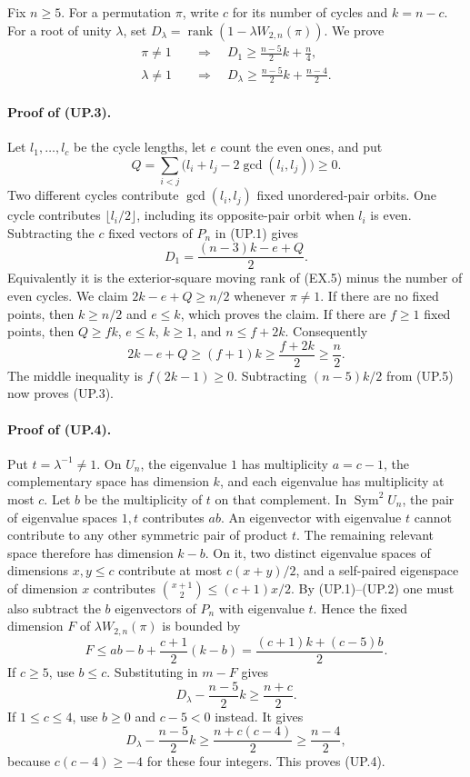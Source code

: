 Fix $n\ge5$.  For a permutation $\pi$, write $c$ for its number
of cycles and $k=n-c$.  For a root of unity $\lambda$, set
$D_\lambda=\operatorname{rank}(1-\lambda W_{2,n}(\pi))$.
We prove
\begin{align}
 \pi\ne1&\quad\Longrightarrow\quad
 D_1\ge\frac{n-5}{2}k+\frac n4,                       \tag{UP.3}\\
 \lambda\ne1&\quad\Longrightarrow\quad
 D_\lambda\ge\frac{n-5}{2}k+\frac{n-4}{2}.             \tag{UP.4}
\end{align}

\paragraph{Proof of (UP.3).}
Let $l_1,\ldots,l_c$ be the cycle lengths, let $e$ count the even
ones, and put
\[
    Q=\sum_{i<j}\bigl(l_i+l_j-2\gcd(l_i,l_j)\bigr)\ge0.
\]
Two different cycles contribute $\gcd(l_i,l_j)$ fixed unordered-pair
orbits.  One cycle contributes $\lfloor l_i/2\rfloor$, including
its opposite-pair orbit when $l_i$ is even.  Subtracting the $c$
fixed vectors of $P_n$ in (UP.1) gives
\[
                     D_1=\frac{(n-3)k-e+Q}{2}.         \tag{UP.5}
\]
Equivalently it is the exterior-square moving rank of (EX.5) minus
the number of even cycles.
We claim $2k-e+Q\ge n/2$ whenever $\pi\ne1$.
If there are no fixed points, then $k\ge n/2$ and $e\le k$,
which proves the claim.  If there are $f\ge1$ fixed points, then
$Q\ge fk$, $e\le k$, $k\ge1$, and $n\le f+2k$.
Consequently
\[
       2k-e+Q\ge(f+1)k\ge\frac{f+2k}{2}\ge\frac n2.
\]
The middle inequality is $f(2k-1)\ge0$.
Subtracting $(n-5)k/2$ from (UP.5) now proves (UP.3).

\paragraph{Proof of (UP.4).}
Put $t=\lambda^{-1}\ne1$.  On $U_n$, the eigenvalue $1$ has
multiplicity $a=c-1$, the complementary space has dimension $k$,
and each eigenvalue has multiplicity at most $c$.
Let $b$ be the multiplicity of $t$ on that complement.
In $\operatorname{Sym}^2U_n$, the pair of eigenvalue spaces $1,t$
contributes $ab$.  An eigenvector with eigenvalue $t$ cannot
contribute to any other symmetric pair of product $t$.
The remaining relevant space therefore has dimension $k-b$.
On it, two distinct eigenvalue spaces of dimensions $x,y\le c$
contribute at most $c(x+y)/2$, and a self-paired eigenspace of
dimension $x$ contributes $\binom{x+1}{2}\le(c+1)x/2$.
By (UP.1)--(UP.2) one must also subtract the $b$ eigenvectors of
$P_n$ with eigenvalue $t$.  Hence the fixed dimension $F$ of
$\lambda W_{2,n}(\pi)$ is bounded by
\[
 F\le ab-b+\frac{c+1}{2}(k-b)
       =\frac{(c+1)k+(c-5)b}{2}.                       \tag{UP.6}
\]
If $c\ge5$, use $b\le c$.  Substituting in $m-F$ gives
\[
            D_\lambda-\frac{n-5}{2}k\ge\frac{n+c}{2}.
\]
If $1\le c\le4$, use $b\ge0$ and $c-5<0$ instead.  It gives
\[
 D_\lambda-\frac{n-5}{2}k
       \ge\frac{n+c(c-4)}2\ge\frac{n-4}{2},
\]
because $c(c-4)\ge-4$ for these four integers.  This proves (UP.4).


